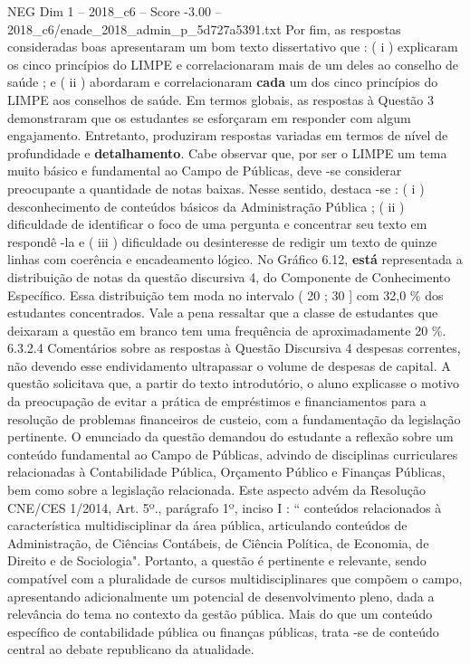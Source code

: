 \begin{textsample}{NEG Dim 1 – 2018\_c6 – Score -3.00 – 2018\_c6/enade\_2018\_admin\_p\_5d727a5391.txt}
Por fim, as respostas consideradas boas apresentaram um bom texto dissertativo que : ( i ) explicaram os cinco princípios do LIMPE e correlacionaram mais de um deles ao conselho de saúde ; e ( ii ) abordaram e correlacionaram \textbf{cada} um dos cinco princípios do LIMPE aos conselhos de saúde.
Em termos globais, as respostas à Questão 3 demonstraram que os estudantes se esforçaram em responder com algum engajamento.
Entretanto, produziram respostas variadas em termos de nível de profundidade e \textbf{detalhamento}.
Cabe observar que, por ser o LIMPE um tema muito básico e fundamental ao Campo de Públicas, deve -se considerar preocupante a quantidade de notas baixas.
Nesse sentido, destaca -se : ( i ) desconhecimento de conteúdos básicos da Administração Pública ; ( ii ) dificuldade de identificar o foco de uma pergunta e concentrar seu texto em respondê -la e ( iii ) dificuldade ou desinteresse de redigir um texto de quinze linhas com coerência e encadeamento lógico.
No Gráfico 6.12, \textbf{está} representada a distribuição de notas da questão discursiva 4, do Componente de Conhecimento Específico.
Essa distribuição tem moda no intervalo ( 20 ; 30 ] com 32,0 \% dos estudantes concentrados.
Vale a pena ressaltar que a classe de estudantes que deixaram a questão em branco tem uma frequência de aproximadamente 20 \%. 6.3.2.4 Comentários sobre as respostas à Questão Discursiva 4 despesas correntes, não devendo esse endividamento ultrapassar o volume de despesas de capital.
A questão solicitava que, a partir do texto introdutório, o aluno explicasse o motivo da preocupação de evitar a prática de empréstimos e financiamentos para a resolução de problemas financeiros de custeio, com a fundamentação da legislação pertinente.
O enunciado da questão demandou do estudante a reflexão sobre um conteúdo fundamental ao Campo de Públicas, advindo de disciplinas curriculares relacionadas à Contabilidade Pública, Orçamento Público e Finanças Públicas, bem como sobre a legislação relacionada.
Este aspecto advém da Resolução CNE/CES 1/2014, Art. 5º., parágrafo 1º, inciso I : “ conteúdos relacionados à característica multidisciplinar da área pública, articulando conteúdos de Administração, de Ciências Contábeis, de Ciência Política, de Economia, de Direito e de Sociologia".
Portanto, a questão é pertinente e relevante, sendo compatível com a pluralidade de cursos multidisciplinares que compõem o campo, apresentando adicionalmente um potencial de desenvolvimento pleno, dada a relevância do tema no contexto da gestão pública.
Mais do que um conteúdo específico de contabilidade pública ou finanças públicas, trata -se de conteúdo central ao debate republicano da atualidade.

\end{textsample}
